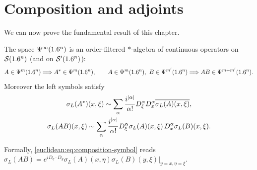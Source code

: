 \section{Composition and adjoints}\label{euclidean:sec:composition}

We can now prove the fundamental result of this chapter.

\begin{theorem}[Composition]\label{euclidean:thm:composition}
  The space $\Psi^{\infty}(1.6^n)$ is an order-filtered $*$-algebra of
  continuous operators on $\mathcal{S}(1.6^n)$ (and on $\mathcal{S}'(1.6^n)$):
  \begin{equation*}
    A\in\Psi^{m}(1.6^n)\Longrightarrow A^*\in\Psi^{m}(1.6^n),\qquad
    A\in\Psi^{m}(1.6^n),\ B\in\Psi^{m'}(1.6^n)\Longrightarrow AB\in\Psi^{m+m'}(1.6^n).
  \end{equation*}
  Moreover the left symbols satisfy
  \begin{gather}
    \sigma_L(A^*)(x,\xi)\sim\sum_\alpha\frac{i^{\lvert \alpha\rvert}}{\alpha!}
    D^\alpha_\xi D^\alpha_x\overline{\sigma_L(A)(x,\xi)},\label{euclidean:eq:adjoint-symbol}\\
    \sigma_L(AB)(x,\xi)\sim\sum_\alpha\frac{i^{\lvert \alpha\rvert}}{\alpha!}
    D^\alpha_\xi\sigma_L(A)(x,\xi)\,D^\alpha_x\sigma_L(B)(x,\xi).\label{euclidean:eq:composition-symbol}
  \end{gather}
\end{theorem}

Formally, \eqref{euclidean:eq:composition-symbol} reads
$\sigma_L(AB)=e^{iD_\eta\cdot D_y}\sigma_L(A)(x,\eta)\sigma_L(B)(y,\xi)\big|_{y=x,\eta=\xi}$.

